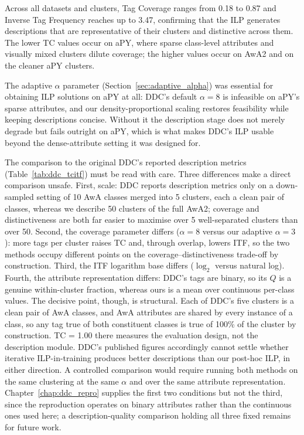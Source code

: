 Across all datasets and clusters, Tag Coverage ranges from 0.18 to 0.87 and Inverse Tag Frequency reaches up to 3.47, confirming that the ILP generates descriptions that are representative of their clusters and distinctive across them. The lower TC values occur on aPY, where sparse class-level attributes and visually mixed clusters dilute coverage; the higher values occur on AwA2 and on the cleaner aPY clusters.

The adaptive $\alpha$ parameter (Section~\ref{sec:adaptive_alpha}) was essential for obtaining ILP solutions on aPY at all: DDC's default $\alpha = 8$ is infeasible on aPY's sparse attributes, and our density-proportional scaling restores feasibility while keeping descriptions concise. Without it the description stage does not merely degrade but fails outright on aPY, which is what makes DDC's ILP usable beyond the dense-attribute setting it was designed for.

The comparison to the original DDC's reported description metrics (Table~\ref{tab:ddc_tcitf}) must be read with care. Three differences make a direct comparison unsafe. First, scale: DDC reports description metrics only on a down-sampled setting of 10 AwA classes merged into 5 clusters, each a clean pair of classes, whereas we describe 50 clusters of the full AwA2; coverage and distinctiveness are both far easier to maximise over 5 well-separated clusters than over 50. Second, the coverage parameter differs ($\alpha = 8$ versus our adaptive $\alpha = 3$): more tags per cluster raises TC and, through overlap, lowers ITF, so the two methods occupy different points on the coverage--distinctiveness trade-off by construction. Third, the ITF logarithm base differs ($\log_2$ versus natural log). Fourth, the attribute representation differs: DDC's tags are binary, so its $Q$ is a genuine within-cluster fraction, whereas ours is a mean over continuous per-class values. The decisive point, though, is structural. Each of DDC's five clusters is a clean pair of AwA classes, and AwA attributes are shared by every instance of a class, so any tag true of both constituent classes is true of 100\% of the cluster by construction. TC = 1.00 there measures the evaluation design, not the description module. DDC's published figures accordingly cannot settle whether iterative ILP-in-training produces better descriptions than our post-hoc ILP, in either direction. A controlled comparison would require running both methods on the same clustering at the same $\alpha$ and over the same attribute representation. Chapter~\ref{chap:ddc_repro} supplies the first two conditions but not the third, since the reproduction operates on binary attributes rather than the continuous ones used here; a description-quality comparison holding all three fixed remains for future work.


